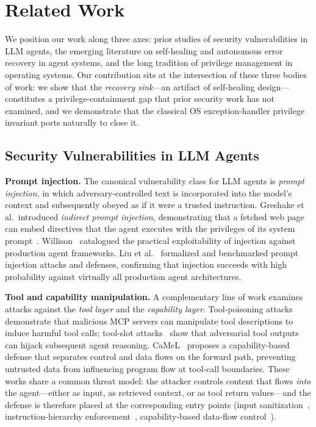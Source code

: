 
\section{Related Work}
\label{sec:related-work}

We position our work along three axes: prior studies of security vulnerabilities in LLM agents, the emerging literature on self-healing and autonomous error recovery in agent systems, and the long tradition of privilege management in operating systems. Our contribution sits at the intersection of these three bodies of work: we show that the \emph{recovery sink}---an artifact of self-healing design---constitutes a privilege-containment gap that prior security work has not examined, and we demonstrate that the classical OS exception-handler privilege invariant ports naturally to close it.

\subsection{Security Vulnerabilities in LLM Agents}
\label{sec:related-injection}

\textbf{Prompt injection.} The canonical vulnerability class for LLM agents is \emph{prompt injection}, in which adversary-controlled text is incorporated into the model's context and subsequently obeyed as if it were a trusted instruction. Greshake et al.\ introduced \emph{indirect prompt injection}, demonstrating that a fetched web page can embed directives that the agent executes with the privileges of its system prompt~\cite{greshake2023indirect}. Willison~\cite{willison2023prompt} catalogued the practical exploitability of injection against production agent frameworks. Liu et al.~\cite{liu2024formalizing} formalized and benchmarked prompt injection attacks and defenses, confirming that injection succeeds with high probability against virtually all production agent architectures.

\textbf{Tool and capability manipulation.} A complementary line of work examines attacks against the \emph{tool layer} and the \emph{capability layer}. Tool-poisoning attacks~\cite{tool-poisoning} demonstrate that malicious MCP servers can manipulate tool descriptions to induce harmful tool calls; tool-slot attacks~\cite{tool-slots} show that adversarial tool outputs can hijack subsequent agent reasoning. CaMeL~\cite{debenedetti2025camel} proposes a capability-based defense that separates control and data flows on the forward path, preventing untrusted data from influencing program flow at tool-call boundaries. These works share a common threat model: the attacker controls content that flows \emph{into} the agent---either as input, as retrieved context, or as tool return values---and the defense is therefore placed at the corresponding entry points (input sanitization~\cite{spotlighting}, instruction-hierarchy enforcement~\cite{instruction-hierarchy}, capability-based data-flow control~\cite{debenedetti2025camel}).


